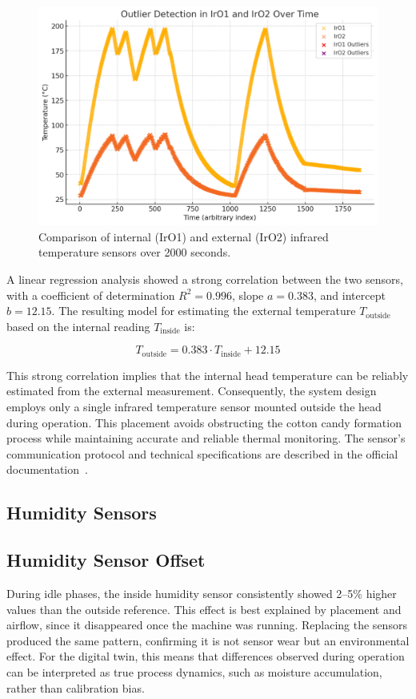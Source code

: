 \begin{figure}[h]
    \centering
    \includegraphics[width=0.85\linewidth]{figures/IrO1 and IrO2 Over Time.png}
    \caption{Comparison of internal (IrO1) and external (IrO2) infrared temperature sensors over 2000 seconds.}
    \label{fig:ir-comparison}
\end{figure}

A linear regression analysis showed a strong correlation between the two sensors, with a coefficient of determination $R^2 = 0.996$, slope $a = 0.383$, and intercept $b = 12.15$. The resulting model for estimating the external temperature $T_{\text{outside}}$ based on the internal reading $T_{\text{inside}}$ is:

\[
T_{\text{outside}} = 0.383 \cdot T_{\text{inside}} + 12.15
\]

This strong correlation implies that the internal head temperature can be reliably estimated from the external measurement. Consequently, the system design employs only a single infrared temperature sensor mounted outside the head during operation. This placement avoids obstructing the cotton candy formation process while maintaining accurate and reliable thermal monitoring. The sensor’s communication protocol and technical specifications are described in the official documentation~\cite{waveshareIRsensor}.

\subsection{Humidity Sensors}

\subsection{Humidity Sensor Offset}
During idle phases, the inside humidity sensor consistently showed 2--5\% higher values than the outside reference. This effect is best explained by placement and airflow, since it disappeared once the machine was running. Replacing the sensors produced the same pattern, confirming it is not sensor wear but an environmental effect. For the digital twin, this means that differences observed during operation can be interpreted as true process dynamics, such as moisture accumulation, rather than calibration bias.

